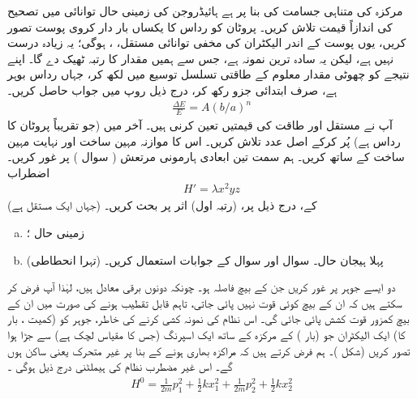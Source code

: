 مرکزہ کی متناہی جسامت کی بنا پر ہے ہائیڈروجن کی  زمینی حال توانائی میں تصحیح کی اندازاً  قیمت تلاش کریں۔ پروٹان کو رداس  کا یکساں بار دار کروی پوست  تصور کریں،  یوں پوست  کے اندر الیکٹران ‏کی مخفی توانائی مستقل، ،  ہوگی؛  یہ  زیادہ  درست نہیں ہے،  لیکن یہ  سادہ  ترین نمونہ ہے،  جس سے ہمیں   مقدار کا  رتبہ ٹھیک  دے گا۔  اپنے نتیجے  کو  چھوٹی مقدار معلوم  کے  طاقتی تسلسل توسیع میں لکھ کر، جہاں  رداس بوہر ہے،  صرف ابتدائی جزو رکھ کر،  درج ذیل روپ میں  جواب حاصل کریں۔ 
\begin{align*}
\frac{\Delta E}{E} = A (b/a)^n
\end{align*}
آپ نے مستقل  اور طاقت  کی قیمتیں  تعین کرنی ہیں۔ آخر میں  (جو تقریباً پروٹان کا  رداس ہے)  پُر کرکے اصل عدد تلاش کریں۔  اس کا موازنہ مہین ساخت اور نہایت مہین ساخت کے ساتھ کریں۔ 
ہم  سمت  تین ابعادی  ہارمونی مرتعش ( سوال  )  پر غور کریں۔ اضطراب
\begin{align*} 
H' = \lambda x^2 y z
\end{align*}
(جہاں  ایک مستقل ہے) کے،  درج ذیل پر،      (رتبہ اول)  اثر       پر بحث کریں۔ 
\begin{enumerate}[a.]
\item
زمینی حال ؛
\item
(تہرا انحطاطی)   پہلا ہیجان حال۔  سوال   اور سوال    کے جوابات استعمال کریں۔ 
\end{enumerate}
 دو ایسے  جوہر پر غور کریں جن کے بیچ فاصلہ  ہو۔ چونکہ دونوں برقی معادل ہیں،  لہٰذا آپ  فرض کر سکتے ہیں کہ  ان کے بیچ کوئی قوت نہیں پائی جاتی،  تاہم   قابل تقطیب ہونے کی صورت میں  ان کے بیچ کمزور قوت کشش پائی  جائی گی۔ اس نظام کی نمونہ کشی کرنے کی خاطر،   جوہر کو   (کمیت ،   بار   کا) ایک الیکٹران جو    (بار ) کے  مرکزہ   کے ساتھ ایک اسپرنگ (جس کا مقیاس لچک   ہے) سے جڑا ہوا تصور کریں  (شکل  )۔   ہم فرض کرتے ہیں کہ مراکزہ بھاری  ہونے کے بنا پر غیر متحرک یعنی ساکن ہوں گے۔ اس غیر مضطرب نظام کی  ہیملٹنی درج ذیل ہوگی ۔
\begin{align}\label{مساوات_غیر_مضطرب_جوہر_کل_ہیملٹنی}
H^0 = \frac{1}{2m} p_1^2 + \frac{1}{2} k x_1^2 + \frac{1}{2m} p_2^2 + \frac{1}{2} k x_2^2
\end{align}
